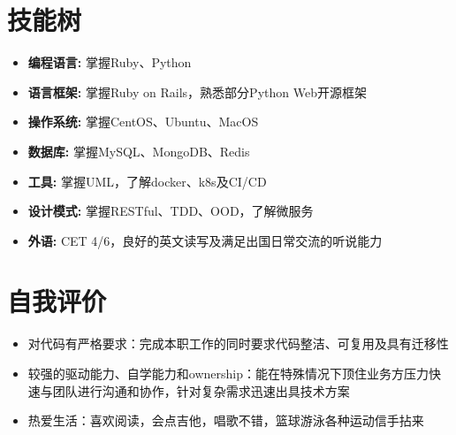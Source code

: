 \documentclass[11pt, a4paper,sans]{moderncv}   %
\begin{document}
\section{\yahei 技能树}
\begin{itemize}
  \item{\yahei \textbf{编程语言:} 掌握Ruby、Python}
  \item{\yahei \textbf{语言框架:} 掌握Ruby on Rails，熟悉部分Python Web开源框架}
  \item{\yahei \textbf{操作系统:} 掌握CentOS、Ubuntu、MacOS}
  \item{\yahei \textbf{数据库:} 掌握MySQL、MongoDB、Redis}
  \item{\yahei \textbf{工具:} 掌握UML，了解docker、k8s及CI/CD}
  \item{\yahei \textbf{设计模式:} 掌握RESTful、TDD、OOD，了解微服务}
  \item{\yahei \textbf{外语:} CET 4/6，良好的英文读写及满足出国日常交流的听说能力}
\end{itemize}
\vspace{-8pt}

\section{\yahei 自我评价}

\begin{itemize}
  \item{\yahei 对代码有严格要求：完成本职工作的同时要求代码整洁、可复用及具有迁移性}
  \item{\yahei 较强的驱动能力、自学能力和ownership：能在特殊情况下顶住业务方压力快速与团队进行沟通和协作，针对复杂需求迅速出具技术方案}
  \item{\yahei 热爱生活：喜欢阅读，会点吉他，唱歌不错，篮球游泳各种运动信手拈来}
\end{itemize}
\end{document}
